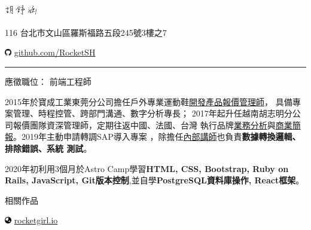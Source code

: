 \documentclass[a4paper,10pt]{article}
\begin{document}
\frenchspacing

\begin{center} 
  \Huge{\includegraphics[height=1.3em,trim=0 10mm 0 -1cm]{shared/signature.png}}\par
  \normalsize {116 台北市文山區羅斯福路五段245號3樓之7}

  \includegraphics[width=0.8em]{shared/github.eps}
  \href{https://github.com/RocketSH}{github.com/RocketSH}
\end{center}

\rule{15.2cm}{0.05em}

\vspace*{1em}
\begin{center}
  \large{應徵職位： 前端工程師}
\end{center}
\vspace*{1em}

\begin{center}
  \begin{minipage}{0.9\textwidth}
        2015年於寶成工業東莞分公司擔任戶外專業運動鞋\underline{開發產品報價管理師}，
        具備專案管理、時程控管、跨部門溝通、數字分析專長；
        2017年起升任越南胡志明分公司報價團隊資深管理師，定期往返中國、法國、台灣
        執行品牌\underline{業務分析}與\underline{商業簡報}。2019年主動申請轉調SAP導入專案
        ，除擔任\underline{內部講師}也負責\textbf{數據轉換邏輯、排除錯誤、系統
          測試}。

        \vspace*{1em}
        2020年初利用3個月於Astro Camp學習\textbf{HTML, CSS, Bootstrap, Ruby on
          Rails, JavaScript, Git版本控制},並自學\textbf{PostgreSQL資料庫操作, React框架}。
  \end{minipage}
\end{center}

\vspace*{1em}
\begin{center}
  \large{相關作品}
\end{center}
\hspace*{1em}
\includegraphics[width=0.8em]{shared/globe-asia.eps}
\href{https://rocketgirl.io/}{rocketgirl.io}
\end{document}
